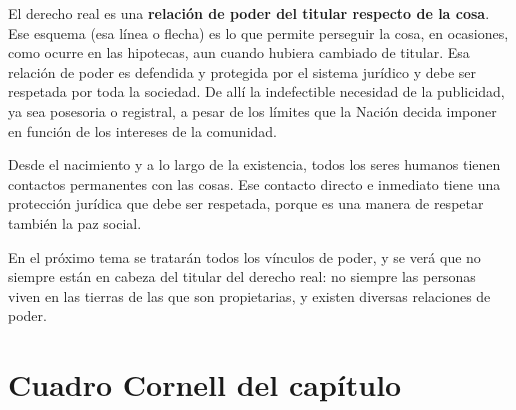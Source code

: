 \documentclass[12pt,oneside]{book}
\begin{document}
El derecho real es una \textbf{relación de poder del titular respecto de la cosa}. Ese esquema (esa línea o flecha) es lo que permite perseguir la cosa, en ocasiones, como ocurre en las hipotecas, aun cuando hubiera cambiado de titular. Esa relación de poder es defendida y protegida por el sistema jurídico y debe ser respetada por toda la sociedad. De allí la indefectible necesidad de la publicidad, ya sea posesoria o registral, a pesar de los límites que la Nación decida imponer en función de los intereses de la comunidad.

Desde el nacimiento y a lo largo de la existencia, todos los seres humanos tienen contactos permanentes con las cosas. Ese contacto directo e inmediato tiene una protección jurídica que debe ser respetada, porque es una manera de respetar también la paz social.

En el próximo tema se tratarán todos los vínculos de poder, y se verá que no siempre están en cabeza del titular del derecho real: no siempre las personas viven en las tierras de las que son propietarias, y existen diversas relaciones de poder.

\section{Cuadro Cornell del capítulo}
\end{document}
